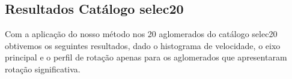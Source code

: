 %
%

\begin{anexosenv}
\partanexos

\chapter{Resultados Catálogo selec20}
\label{chap:anexoselec20}

Com a aplicação do nosso método nos 20 aglomerados do catálogo selec20 obtivemos os seguintes resultados, dado o histograma de velocidade, o eixo principal e o perfil de rotação apenas para os aglomerados que apresentaram rotação significativa.  

\begin{figure}[H] %
\vspace{-2pt}
\centering
{}

\end{figure}
\end{anexosenv}
